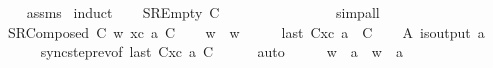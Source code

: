 \begin{isabellebody}
%
\isadelimproof
\ \ %
\endisadelimproof
%
\isatagproof
{}\isamarkupfalse%
\ assms\isanewline
{}\isamarkupfalse%
\ induct\isanewline
\ \ \isamarkupfalse%
\ {\isacharparenleft}{\kern0pt}SREmpty\ C{\isacharparenright}{\kern0pt}\isanewline
\ \ \isamarkupfalse%
\ {\isachardoublequoteopen}{\isasymepsilon}{\isasymdown}\isactrlsub {\isacharbang}{\kern0pt}\ {\isacharequal}{\kern0pt}\ {\isasymepsilon}{\isachardoublequoteclose}\ \ {\isachardoublequoteopen}{\isasymepsilon}{\isasymdown}\isactrlsub {\isacharquery}{\kern0pt}\ {\isacharequal}{\kern0pt}\ {\isasymepsilon}{\isachardoublequoteclose}\isanewline
\ \ \ \ \isamarkupfalse%
\ simp{\isacharunderscore}{\kern0pt}all\isanewline
{}\isamarkupfalse%
\isanewline
\ \ \isamarkupfalse%
\ {\isacharparenleft}{\kern0pt}SRComposed\ C{}\ w\ xc\ a\ C{\isacharparenright}{\kern0pt}\isanewline
\ \ \isamarkupfalse%
\ {\isachardoublequoteopen}w{\isasymdown}\isactrlsub {\isacharbang}{\kern0pt}\ {\isacharequal}{\kern0pt}\ w{\isachardoublequoteclose}\isanewline
\ \ \isamarkupfalse%
\ \isamarkupfalse%
\ {\isachardoublequoteopen}last\ {\isacharparenleft}{\kern0pt}C{}{\isacharhash}{\kern0pt}xc{\isacharparenright}{\kern0pt}\ {\isasymmidarrow}{\isasymlangle}a{\isacharcomma}{\kern0pt}\ {\isasymzero}{\isasymrangle}{\isasymrightarrow}\ C{\isachardoublequoteclose}\isanewline
\ \ \isamarkupfalse%
\ A{\isacharcolon}{\kern0pt}\ {\isachardoublequoteopen}is{\isacharunderscore}{\kern0pt}output\ a{\isachardoublequoteclose}\isanewline
\ \ \ \ \isamarkupfalse%
\ sync{\isacharunderscore}{\kern0pt}step{\isacharunderscore}{\kern0pt}rev{\isacharparenleft}{\kern0pt}{}{\isacharparenright}{\kern0pt}{\isacharbrackleft}{\kern0pt}of\ {\isachardoublequoteopen}last\ {\isacharparenleft}{\kern0pt}C{}{\isacharhash}{\kern0pt}xc{\isacharparenright}{\kern0pt}{\isachardoublequoteclose}\ a\ C{\isacharbrackright}{\kern0pt}\isanewline
\ \ \ \ \isamarkupfalse%
\ auto\isanewline
\ \ \isamarkupfalse%
\ \isamarkupfalse%
\ {\isachardoublequoteopen}{\isacharparenleft}{\kern0pt}w\ {\isasymcdot}\ {\isacharbrackleft}{\kern0pt}a{\isacharbrackright}{\kern0pt}{\isacharparenright}{\kern0pt}{\isasymdown}\isactrlsub {\isacharbang}{\kern0pt}\ {\isacharequal}{\kern0pt}\ w\ {\isasymcdot}\ {\isacharbrackleft}{\kern0pt}a{\isacharbrackright}{\kern0pt}{\isachardoublequoteclose}\isanewline

\end{isabellebody}
